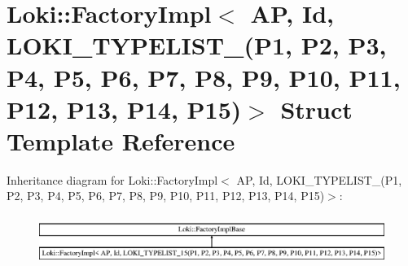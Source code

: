 \hypertarget{structLoki_1_1FactoryImpl_3_01AP_00_01Id_00_01LOKI__TYPELIST__15_07P1_00_01P2_00_01P3_00_01P4_00409b4228cd5dfbe237d6d4489608665a}{}\section{Loki\+:\+:Factory\+Impl$<$ A\+P, Id, L\+O\+K\+I\+\_\+\+T\+Y\+P\+E\+L\+I\+S\+T\+\_(P1, P2, P3, P4, P5, P6, P7, P8, P9, P10, P11, P12, P13, P14, P15)$>$ Struct Template Reference}
\label{structLoki_1_1FactoryImpl_3_01AP_00_01Id_00_01LOKI__TYPELIST__15_07P1_00_01P2_00_01P3_00_01P4_00409b4228cd5dfbe237d6d4489608665a}
Inheritance diagram for Loki\+:\+:Factory\+Impl$<$ A\+P, Id, L\+O\+K\+I\+\_\+\+T\+Y\+P\+E\+L\+I\+S\+T\+\_(P1, P2, P3, P4, P5, P6, P7, P8, P9, P10, P11, P12, P13, P14, P15)$>$\+:\begin{figure}[H]
\begin{center}
\leavevmode
\includegraphics[height=1.616162cm]{structLoki_1_1FactoryImpl_3_01AP_00_01Id_00_01LOKI__TYPELIST__15_07P1_00_01P2_00_01P3_00_01P4_00409b4228cd5dfbe237d6d4489608665a}
\end{center}
\end{figure}
